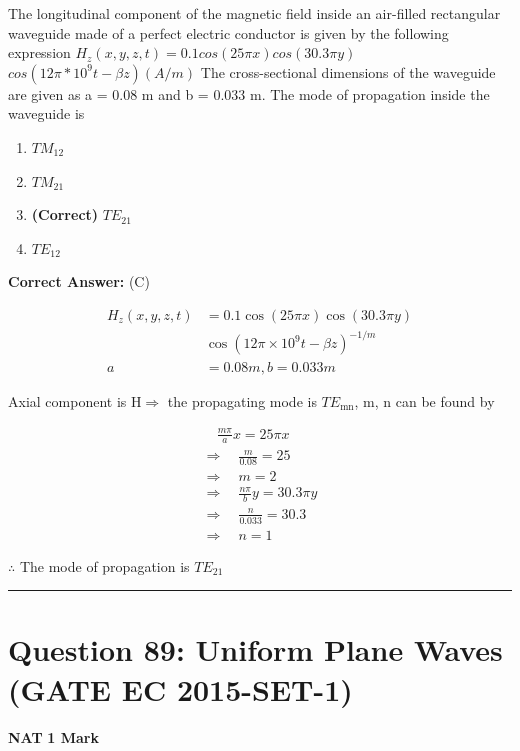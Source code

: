 \documentclass[11pt,a4paper]{article}
\begin{document}
\noindent The longitudinal component of the magnetic field inside an air-filled rectangular waveguide made of a perfect electric conductor is given by the following expression 
 $H_{z}(x,y,z,t)=0.1 cos(25\pi x) cos(30.3 \pi y)$ $cos(12 \pi *10^{9}t-\beta z) (A/m)$ 
 The cross-sectional dimensions of the waveguide are given as a = 0.08 m and b = 0.033 m. The
mode of propagation inside the waveguide is


\begin{enumerate}[label=(\Alph*)]
    \item $TM_{12}$
    \item $TM_{21}$
    \item \textbf{(Correct)} $TE_{21}$
    \item $TE_{12}$
\end{enumerate}

\noindent \textbf{Correct Answer:} (C)

\begin{tcolorbox}[solbox, title=Detailed Solution -- Question 88]
\[
\begin{aligned} H_{z}(x, y, z, t) &=0.1 \cos (25 \pi x) \cos (30.3 \pi y) \\ & \cos \left(12 \pi \times 10^{9} t-\beta z\right)^{-1 / m}\\ a &=0.08 m, b=0.033 m \end{aligned}
\]

 Axial component is $\mathrm{H} \Rightarrow$ the propagating mode is 
$T E_{\text {mn}}$, m, n can be found by

\[
\begin{array}{l} \quad \frac{m \pi}{a} x=25 \pi x \\ \Rightarrow \quad \frac{m}{0.08}=25 \\ \Rightarrow \quad m=2 \\ \Rightarrow \quad \frac{n\pi}{b} y=30.3 \pi y \\ \Rightarrow \quad \frac{n}{0.033}=30.3 \\ \Rightarrow \quad n=1 \end{array}
\]

$\therefore$ The mode of propagation is $T E_{21}$
\end{tcolorbox}

\vspace{1.5em}
\hrule
\vspace{1.5em}

\section*{Question 89: Uniform Plane Waves (GATE EC 2015-SET-1)}
\noindent \textbf{\color{primary}NAT} \hfill \textbf{\color{secondary}1 Mark}
\end{document}
